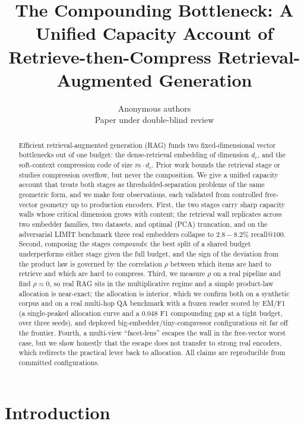 \documentclass{article}
\title{The Compounding Bottleneck: A Unified Capacity Account of\\ Retrieve-then-Compress Retrieval-Augmented Generation}
\author{Anonymous authors\\Paper under double-blind review}
\newcommand{\dr}{d_r}
\newcommand{\dc}{d_c}
\begin{document}
\maketitle

\begin{abstract}
Efficient retrieval-augmented generation (RAG) funds two fixed-dimensional vector bottlenecks
out of one budget: the dense-retrieval embedding of dimension $\dr$, and the soft-context
compression code of size $m\!\cdot\!\dc$. Prior work bounds the retrieval stage or studies
compression overflow, but never the composition. We give a unified capacity account that treats
both stages as thresholded-separation problems of the same geometric form, and we make four
observations, each validated from controlled free-vector geometry up to production encoders.
First, the two stages carry sharp capacity walls whose critical dimension grows with content;
the retrieval wall replicates across two embedder families, two datasets, and optimal (PCA)
truncation, and on the adversarial LIMIT benchmark three real embedders collapse to
$2.8\!-\!8.2\%$ recall@100. Second, composing the stages \emph{compounds}: the best split of a
shared budget underperforms either stage given the full budget, and the sign of the deviation
from the product law is governed by the correlation $\rho$ between which items are hard to
retrieve and which are hard to compress. Third, we measure $\rho$ on a real pipeline and find
$\rho\!\approx\!0$, so real RAG sits in the multiplicative regime and a simple product-law
allocation is near-exact; the allocation is interior, which we confirm both on a synthetic corpus and
on a real multi-hop QA benchmark with a frozen reader scored by EM/F1 (a single-peaked allocation
curve and a $0.048$ F1 compounding gap at a tight budget, over three seeds), and deployed
big-embedder/tiny-compressor configurations sit far off the frontier. Fourth, a multi-view
``facet-lens'' escapes the wall in
the free-vector worst case, but we show honestly that the escape does not transfer to strong real
encoders, which redirects the practical lever back to allocation. All claims are reproducible from
committed configurations.
\end{abstract}

\section{Introduction}
\end{document}
